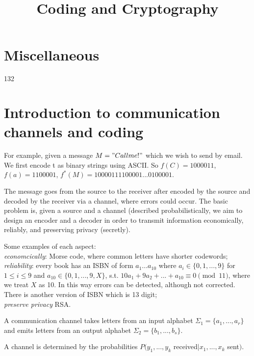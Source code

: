 \documentclass[a4paper]{article}
\begin{document}
\title{Coding and Cryptography}

\maketitle

\newpage

\tableofcontents

\newpage

\section{Miscellaneous}

132

\newpage

\section{Introduction to communication channels and coding}
For example, given a message $M = "Call me!"$ which we wish to send by email. We first encode t as binary strings using ASCII. So $f(C) = 1000011$, $f(a) = 1100001$, $f^*(M) = 1000011 1100001 ... 0100001$. 

The message goes from the source to the receiver after encoded by the source and decoded by the receiver via a channel, where errors could occur. The basic problem is, given a source and a channel (described probabilistically, we aim to design an encoder and a decoder in order to transmit information economically, reliably, and preserving privacy (secretly).

Some examples of each aspect:\\
\emph{economcically}: Morse code, where common letters have shorter codewords;\\
\emph{reliability}: every book has an ISBN of form $a_1...a_{10}$ where $a_i \in \{0,1,...,9\}$ for $1 \leq i \leq 9$ and $a_{10} \in \{0,1,...,9,X\}$, s.t. $10 a_1 + 9a_2+...+a_{10} \equiv 0 \pmod 11$, where we treat $X$ as 10. In this way errors can be detected, although not corrected. There is another version of ISBN which is 13 digit;\\
\emph{preserve privacy} RSA.

A communication channel takes letters from an input alphabet $\Sigma_1 = \{a_1,...,a_r\}$ and emits letters from an output alphabet $\Sigma_2 = \{b_1,...,b_s\}$.

A channel is determined by the probabilities $P(y_1,...,y_k$ received$|x_1,...,x_k$ sent$)$.
\end{document}
